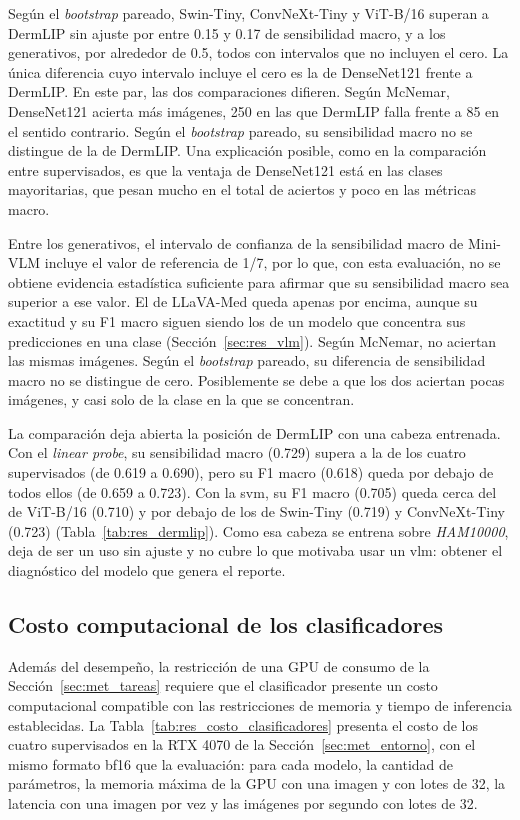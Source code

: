 Según el \emph{bootstrap} pareado, Swin-Tiny, ConvNeXt-Tiny y ViT-B/16 superan a DermLIP sin ajuste por entre 0.15 y 0.17 de sensibilidad macro, y a los
generativos, por alrededor de 0.5, todos con intervalos que no incluyen el cero. La única diferencia cuyo intervalo
incluye el cero es la de DenseNet121 frente a DermLIP. En este par, las dos comparaciones difieren. Según McNemar, DenseNet121 acierta más imágenes, 250 en las que DermLIP falla frente a 85 en el sentido contrario. Según el \emph{bootstrap} pareado, su sensibilidad macro no se distingue de la de DermLIP. Una explicación posible, como en la
comparación entre supervisados, es que la ventaja de DenseNet121 está en las clases mayoritarias, que pesan mucho en
el total de aciertos y poco en las métricas macro.

Entre los generativos, el intervalo de confianza de la sensibilidad macro de Mini-VLM incluye el valor de referencia de 1/7, por lo que, con esta evaluación, no se obtiene evidencia estadística suficiente para afirmar que su sensibilidad macro sea superior a ese valor. El de LLaVA-Med queda apenas por encima, aunque su exactitud y su F1 macro siguen siendo los
de un modelo que concentra sus predicciones en una clase (Sección~\ref{sec:res_vlm}). Según McNemar, no aciertan las mismas imágenes. Según el \emph{bootstrap} pareado, su diferencia de sensibilidad macro no se distingue de cero. Posiblemente se debe a que los dos
aciertan pocas imágenes, y casi solo de la clase en la que se concentran.

La comparación deja abierta la posición de DermLIP con una cabeza entrenada. Con el \emph{linear probe}, su sensibilidad macro (0.729) supera a la de los cuatro supervisados (de 0.619 a 0.690), pero su F1 macro (0.618) queda por debajo de todos ellos (de 0.659 a 0.723). Con la \gls{svm}, su F1 macro (0.705) queda cerca del de ViT-B/16 (0.710) y por debajo de los de Swin-Tiny (0.719) y ConvNeXt-Tiny (0.723) (Tabla~\ref{tab:res_dermlip}). Como esa cabeza se entrena sobre
\emph{HAM10000}, deja de ser un uso sin ajuste y no cubre lo que motivaba usar un \gls{vlm}: obtener el diagnóstico
del modelo que genera el reporte.

\subsection{Costo computacional de los clasificadores}
\label{sec:res_costo_clasificadores}

Además del desempeño, la restricción de una GPU de consumo de la Sección~\ref{sec:met_tareas} requiere que el clasificador presente un costo computacional compatible con las restricciones de memoria y tiempo de inferencia establecidas. La Tabla~\ref{tab:res_costo_clasificadores} presenta el costo de los cuatro
supervisados en la RTX 4070 de la Sección~\ref{sec:met_entorno}, con el mismo formato bf16 que la evaluación: para
cada modelo, la cantidad de parámetros, la memoria máxima de la GPU con una imagen y con lotes de 32, la latencia con
una imagen por vez y las imágenes por segundo con lotes de 32.

